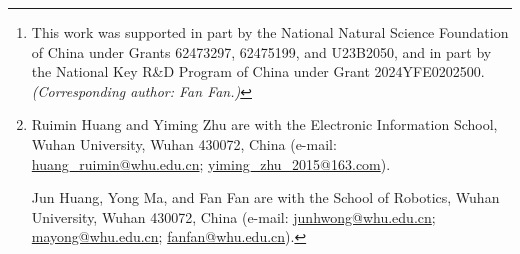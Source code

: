 
\author{
    Ruimin Huang,
    Jun Huang,
    Yong Ma,
    Fan Fan,
    and Yiming Zhu

    \thanks{
        This work was supported in part by the National Natural Science Foundation of China under Grants 62473297, 62475199, and U23B2050, and in part by the National Key R\&D Program of China under Grant 2024YFE0202500. \emph{(Corresponding author: Fan Fan.)}
    }

    \thanks{
        Ruimin Huang and Yiming Zhu are with the Electronic Information School, Wuhan University, Wuhan 430072, China
        (e-mail: \href{mailto:huang_ruimin@whu.edu.cn}{huang\_ruimin@whu.edu.cn}; 
        \href{mailto:yiming_zhu_2015@163.com}{yiming\_zhu\_2015@163.com}).

        Jun Huang, Yong Ma, and Fan Fan are with the School of Robotics, Wuhan University, Wuhan 430072, China
        (e-mail: \href{mailto:junhwong@whu.edu.cn}{junhwong@whu.edu.cn};
        \href{mailto:mayong@whu.edu.cn}{mayong@whu.edu.cn};
        \href{mailto:fanfan@whu.edu.cn}{fanfan@whu.edu.cn}).
    }
}

